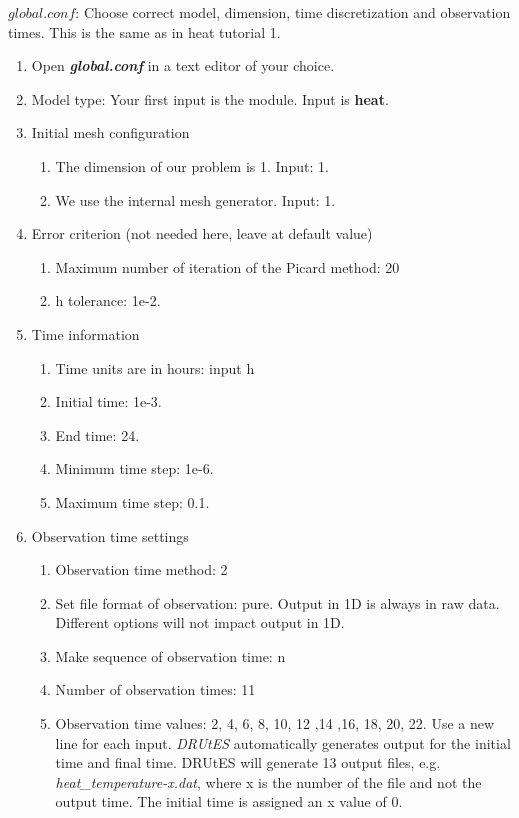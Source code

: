 \documentclass[
10pt, %
a4paper, %
oneside, %
headinclude,footinclude, %
BCOR5mm, %
]{scrartcl}
\begin{document}
$global.conf$: Choose correct model, dimension, time discretization and observation times. This is the same as in heat tutorial 1.
\begin{enumerate}
\item Open \textbf{\emph{global.conf}} in a text editor of your choice. 
\item Model type: Your first input is the module. Input is \textbf{heat}.
\item Initial mesh configuration \begin{enumerate}
\item The dimension of our problem is 1. Input: 1.
\item We use the internal mesh generator. Input: 1. 
\end{enumerate}
\item Error criterion (not needed here, leave at default value) \begin{enumerate} 
\item Maximum number of iteration of the Picard method: 20 
\item h tolerance: 1e-2.
\end{enumerate}
\item Time information 
\begin{enumerate} 
\item Time units are in hours: input h
\item Initial time: 1e-3.
\item End time: 24.
\item Minimum time step: 1e-6.
\item Maximum time step: 0.1.
\end{enumerate}
\item Observation time settings \begin{enumerate}
\item Observation time method: 2
\item Set file format of observation: pure. Output in 1D is always in raw data. Different options will not impact output in 1D.
\item Make sequence of observation time: n
\item Number of observation times: 11
\item Observation time values: 2, 4, 6, 8, 10, 12 ,14 ,16, 18, 20, 22. Use a new line for each input. \textit{DRUtES} automatically generates output for the initial time and final time. DRUtES will generate 13 output files, e.g. \textit{heat\_temperature-x.dat}, where x is the number of the file and not the output time. The initial time is assigned an x value of 0. 

\end{enumerate}
\end{enumerate}
\end{document}
